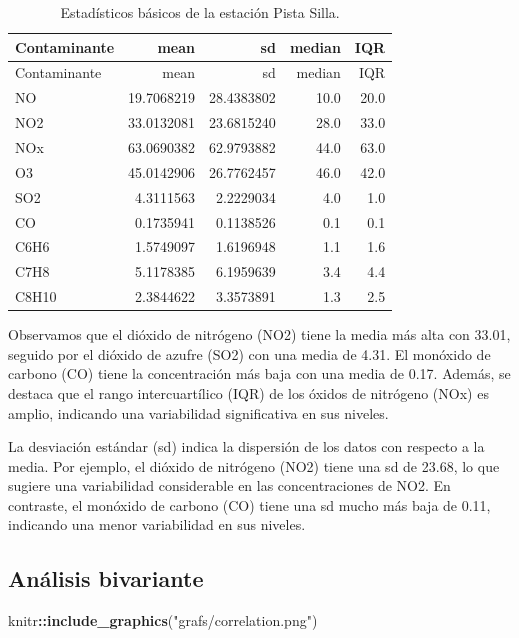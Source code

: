 \documentclass[
]{article}
\newenvironment{Shaded}{\begin{snugshade}}{\end{snugshade}}
\newcommand{\FunctionTok}[1]{\textcolor[rgb]{0.13,0.29,0.53}{\textbf{#1}}}
\newcommand{\NormalTok}[1]{#1}
\newcommand{\SpecialCharTok}[1]{\textcolor[rgb]{0.81,0.36,0.00}{\textbf{#1}}}
\newcommand{\StringTok}[1]{\textcolor[rgb]{0.31,0.60,0.02}{#1}}
\begin{document}
\begin{longtable}[]{@{}lrrrr@{}}
\caption{Estadísticos básicos de la estación Pista
Silla.}\tabularnewline
\toprule\noalign{}
Contaminante & mean & sd & median & IQR \\
\midrule\noalign{}
\endfirsthead
\toprule\noalign{}
Contaminante & mean & sd & median & IQR \\
\midrule\noalign{}
\endhead
\bottomrule\noalign{}
\endlastfoot
NO & 19.7068219 & 28.4383802 & 10.0 & 20.0 \\
NO2 & 33.0132081 & 23.6815240 & 28.0 & 33.0 \\
NOx & 63.0690382 & 62.9793882 & 44.0 & 63.0 \\
O3 & 45.0142906 & 26.7762457 & 46.0 & 42.0 \\
SO2 & 4.3111563 & 2.2229034 & 4.0 & 1.0 \\
CO & 0.1735941 & 0.1138526 & 0.1 & 0.1 \\
C6H6 & 1.5749097 & 1.6196948 & 1.1 & 1.6 \\
C7H8 & 5.1178385 & 6.1959639 & 3.4 & 4.4 \\
C8H10 & 2.3844622 & 3.3573891 & 1.3 & 2.5 \\
\end{longtable}

Observamos que el dióxido de nitrógeno (NO2) tiene la media más alta con
33.01, seguido por el dióxido de azufre (SO2) con una media de 4.31. El
monóxido de carbono (CO) tiene la concentración más baja con una media
de 0.17. Además, se destaca que el rango intercuartílico (IQR) de los
óxidos de nitrógeno (NOx) es amplio, indicando una variabilidad
significativa en sus niveles.

La desviación estándar (sd) indica la dispersión de los datos con
respecto a la media. Por ejemplo, el dióxido de nitrógeno (NO2) tiene
una sd de 23.68, lo que sugiere una variabilidad considerable en las
concentraciones de NO2. En contraste, el monóxido de carbono (CO) tiene
una sd mucho más baja de 0.11, indicando una menor variabilidad en sus
niveles.

\hypertarget{anuxe1lisis-bivariante}{%
\subsection{Análisis bivariante}\label{anuxe1lisis-bivariante}}

\begin{Shaded}
\begin{Highlighting}[]
\NormalTok{knitr}\SpecialCharTok{::}\FunctionTok{include\_graphics}\NormalTok{(}\StringTok{"grafs/correlation.png"}\NormalTok{)}
\end{Highlighting}
\end{Shaded}
\end{document}
